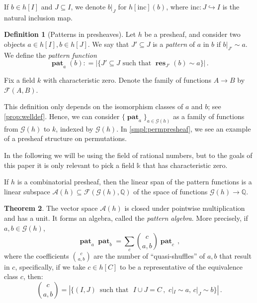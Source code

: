 \documentclass[12pt, reqno]{amsart}
\theoremstyle{definition}
\newtheorem{thm}{Theorem}[section]
\newtheorem{defin}[thm]{Definition}
\DeclareMathOperator{\rest}{\mathbf{res}}
\DeclareMathOperator{\pat}{\mathbf{pat}}
\begin{document}
If $b \in h[I]$ and $J \subseteq I$, we denote $b|_J$ for $h[\mathrm{inc}](b)$, where $\mathrm{inc}: J \hookrightarrow I$ is the natural inclusion map.

\begin{defin}[Patterns in presheaves]\label{defin:pattern}
Let $h$ be a presheaf, and consider two objects $a\in h[I], b\in h[J]$.
We say that $J'\subseteq J $ is a \textit{pattern} of $a$ in $b$ if $b|_{J'} \sim a$.
We define the \textit{pattern function} $$\pat_a( b) : = \left| \{J' \subseteq J \text{ such that } \rest_{J'}(b) \sim a \} \right| \,  . $$

\end{defin}

Fix a field $k$ with characteristic zero.
Denote the family of functions $A \to B$ by $\mathcal{F} (A, B)$.

This definition only depends on the isomorphism classes of $a$ and $b$; see \cref{prop:welldef}.
Hence, we can consider $\{ \pat_a \}_{a\in \mathcal{G}(h)}$ as a family of functions from $\mathcal{G}(h)$ to $k$, indexed by $\mathcal{G}(h)$.
In \cref{smpl:permpresheaf}, we see an example of a presheaf structure on permutations.


In the following we will be using the field of rational numbers, but to the goals of this paper it is only relevant to pick a field $\mathbb{k}$ that has characteristic zero.

If $h$ is a combinatorial presheaf, then the linear span of the pattern functions  is a linear subspace $\mathcal{A}(h) \subseteq \mathcal{F}(\mathcal{G}(h) , \mathbb{Q}) $ of the space of functions $\mathcal{G}(h) \to \mathbb{Q}$.

\begin{thm}\label{thm:algfunctor}
The vector space $\mathcal{A}(h)$ is closed under pointwise multiplication and has a unit.
It forms an algebra, called the \textit{pattern algebra}.
More precisely, if $a, b \in \mathcal G(h)$,
\begin{equation}\label{eq:prodrule}
\pat_ a   \pat_b = \sum_c \binom{c}{a, b} \pat_c \, ,
\end{equation}
where the coefficients $\binom{c}{a, b}$ are the number of ``quasi-shuffles'' of $a, b$ that result in $c$, specifically, if we take $c\in h[C]$ to be a representative of the equivalence class $c$, then:
$$ \binom{c}{a, b} = \left| \{(I, J) \, \text{ such that } \, \,  I \cup J = C \, ,\, \, c|_{I} \sim a, \, c|_{J} \sim b \} \right| \, .  $$
\end{thm} 
\end{document}
